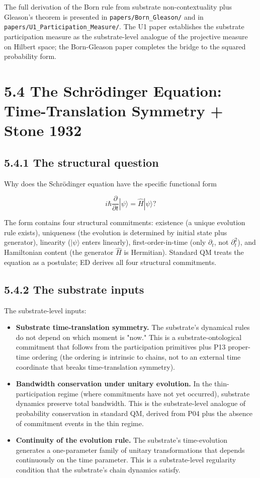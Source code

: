 \documentclass[11pt]{book}
\begin{document}
The full derivation of the Born rule from substrate non-contextuality plus Gleason's theorem is presented in \texttt{papers/Born\_Gleason/} and in \texttt{papers/U1\_Participation\_Measure/}. The U1 paper establishes the substrate participation measure as the substrate-level analogue of the projective measure on Hilbert space; the Born-Gleason paper completes the bridge to the squared probability form.

\section{5.4 The Schrödinger Equation: Time-Translation Symmetry + Stone 1932}

\subsection{5.4.1 The structural question}

Why does the Schrödinger equation have the specific functional form

\[
i\hbar\frac{\partial}{\partial t}|\psi\rangle = \hat H |\psi\rangle?
\]

The form contains four structural commitments: existence (a unique evolution rule exists), uniqueness (the evolution is determined by initial state plus generator), linearity ($|\psi\rangle$ enters linearly), first-order-in-time (only $\partial_t$, not $\partial_t^2$), and Hamiltonian content (the generator $\hat H$ is Hermitian). Standard QM treats the equation as a postulate; ED derives all four structural commitments.

\subsection{5.4.2 The substrate inputs}

The substrate-level inputs:

\begin{itemize}
\item \textbf{Substrate time-translation symmetry.} The substrate's dynamical rules do not depend on which moment is "now." This is a substrate-ontological commitment that follows from the participation primitives plus P13 proper-time ordering (the ordering is intrinsic to chains, not to an external time coordinate that breaks time-translation symmetry).
\item \textbf{Bandwidth conservation under unitary evolution.} In the thin-participation regime (where commitments have not yet occurred), substrate dynamics preserve total bandwidth. This is the substrate-level analogue of probability conservation in standard QM, derived from P04 plus the absence of commitment events in the thin regime.
\item \textbf{Continuity of the evolution rule.} The substrate's time-evolution generates a one-parameter family of unitary transformations that depends continuously on the time parameter. This is a substrate-level regularity condition that the substrate's chain dynamics satisfy.
\end{itemize}
\end{document}
